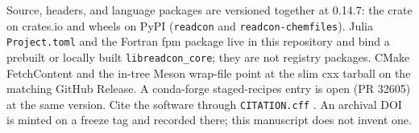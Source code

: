 \documentclass[preprint,12pt]{elsarticle}
\begin{document}
Source, headers, and language packages are versioned together at
0.14.7: the crate on crates.io and wheels on PyPI (\texttt{readcon}
and \texttt{readcon-chemfiles}). Julia \texttt{Project.toml} and the
Fortran fpm package live in this repository and bind a prebuilt or
locally built \texttt{libreadcon\_core}; they are not registry
packages. CMake FetchContent and the in-tree Meson wrap-file point
at the slim cxx tarball on the matching GitHub Release. A
conda-forge staged-recipes entry is open (PR 32605) at the same
version. Cite the software through \texttt{CITATION.cff}
\cite{smithSoftwareCitationPrinciples2016}. An archival DOI is
minted on a freeze tag and recorded there; this manuscript does not
invent one.



\end{document}
